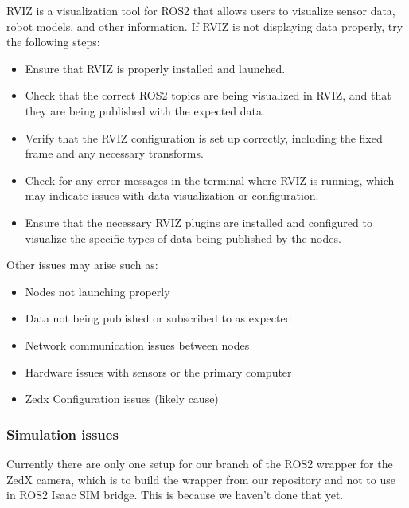 RVIZ is a visualization tool for ROS2 that allows users to visualize sensor data, robot models, and other information. If RVIZ is not displaying data properly, try the following steps:
    \begin{itemize}
        \item Ensure that RVIZ is properly installed and launched.
        \item Check that the correct ROS2 topics are being visualized in RVIZ, and that they are being published with the expected data.
        \item Verify that the RVIZ configuration is set up correctly, including the fixed frame and any necessary transforms.
        \item Check for any error messages in the terminal where RVIZ is running, which may indicate issues with data visualization or configuration.
        \item Ensure that the necessary RVIZ plugins are installed and configured to visualize the specific types of data being published by the nodes.
    \end{itemize}

    Other issues may arise such as:

    \begin{itemize}
        \item Nodes not launching properly
        \item Data not being published or subscribed to as expected
        \item Network communication issues between nodes
        \item Hardware issues with sensors or the primary computer
        \item Zedx Configuration issues (likely cause)
    \end{itemize}

\subsubsection{Simulation issues}
Currently there are only one setup for our branch of the ROS2 wrapper for the ZedX camera, which is to build the wrapper from our repository and not to use in ROS2 Isaac SIM bridge.
This is because we haven't done that yet.